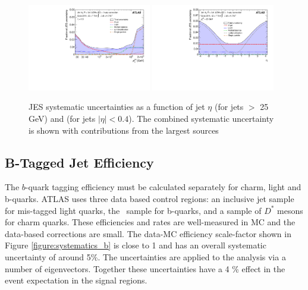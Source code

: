 \begin{figure}[htbp]
\begin{center}
\includegraphics[width=0.48\textwidth]{figs/systematics/fig_61a}
\includegraphics[width=0.48\textwidth]{figs/systematics/fig_61c}
\caption{JES systematic uncertainties as a function of jet $\eta$ (for jets \pt $>$ 25 GeV) and \pt (for jets $|\eta|<0.4$). The combined systematic uncertainty is shown with contributions from the largest sources}
\label{figure:systematics_jes}
\end{center}
\end{figure}


\subsection{B-Tagged Jet Efficiency}

The $b$-quark tagging efficiency must be calculated separately for charm, light and b-quarks. ATLAS uses three data based control regions: an inclusive jet sample for mis-tagged light quarks\cite{mistagratecalibration}, the \ttbar\ sample for b-quarks\cite{bjetcalibration}, and a sample of $D^{*}$ mesons for charm quarks\cite{cjetcalibration}. These efficiencies and rates are well-measured in MC and the data-based corrections are small. The data-MC efficiency scale-factor shown in Figure \ref{figure:systematics_b} is close to 1 and has an overall systematic uncertainty of around 5\%. The uncertainties are applied to the analysis via a number of eigenvectors. Together these uncertainties have a 4 \% effect in the event expectation in the signal regions. 

